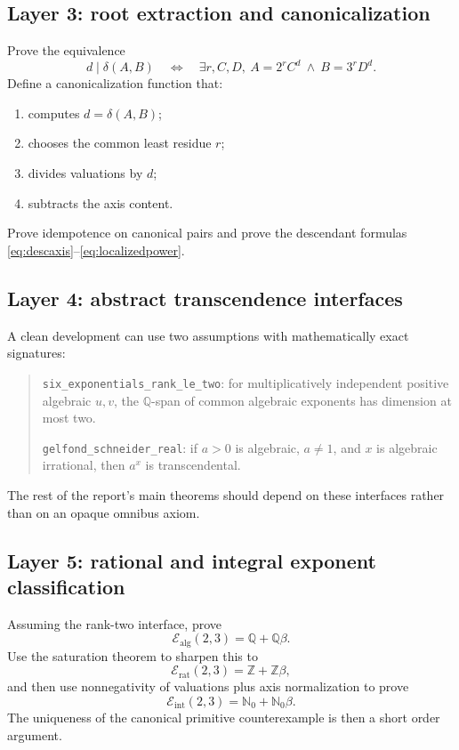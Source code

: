 \documentclass[11pt]{article}
\numberwithin{equation}{section}
\theoremstyle{definition}
\newcommand{\Q}{\mathbb{Q}}
\newcommand{\Z}{\mathbb{Z}}
\newcommand{\N}{\mathbb{N}}
\newcommand{\defect}{\delta}
\newcommand{\Ealg}{\mathcal E_{\mathrm{alg}}}
\newcommand{\Erat}{\mathcal E_{\mathrm{rat}}}
\newcommand{\Eint}{\mathcal E_{\mathrm{int}}}
\begin{document}
\subsection{Layer 3: root extraction and canonicalization}

Prove the equivalence
\[
 d\mid\defect(A,B)
 \quad\Longleftrightarrow\quad
 \exists r,C,D,
 \ A=2^rC^d\ \wedge\ B=3^rD^d.
\]
Define a canonicalization function that:
\begin{enumerate}
\item computes \(d=\defect(A,B)\);
\item chooses the common least residue \(r\);
\item divides valuations by \(d\);
\item subtracts the axis content.
\end{enumerate}
Prove idempotence on canonical pairs and prove the descendant formulas \eqref{eq:descaxis}--\eqref{eq:localizedpower}.

\subsection{Layer 4: abstract transcendence interfaces}

A clean development can use two assumptions with mathematically exact signatures:

\begin{quote}\small
\texttt{six\_exponentials\_rank\_le\_two}: for multiplicatively independent positive algebraic \(u,v\), the \(\Q\)-span of common algebraic exponents has dimension at most two.

\texttt{gelfond\_schneider\_real}: if \(a>0\) is algebraic, \(a\ne1\), and \(x\) is algebraic irrational, then \(a^x\) is transcendental.
\end{quote}

The rest of the report's main theorems should depend on these interfaces rather than on an opaque omnibus axiom.

\subsection{Layer 5: rational and integral exponent classification}

Assuming the rank-two interface, prove
\[
       \Ealg(2,3)=\Q+\Q\beta.
\]
Use the saturation theorem to sharpen this to
\[
       \Erat(2,3)=\Z+\Z\beta,
\]
and then use nonnegativity of valuations plus axis normalization to prove
\[
       \Eint(2,3)=\N_0+\N_0\beta.
\]
The uniqueness of the canonical primitive counterexample is then a short order argument.
\end{document}
